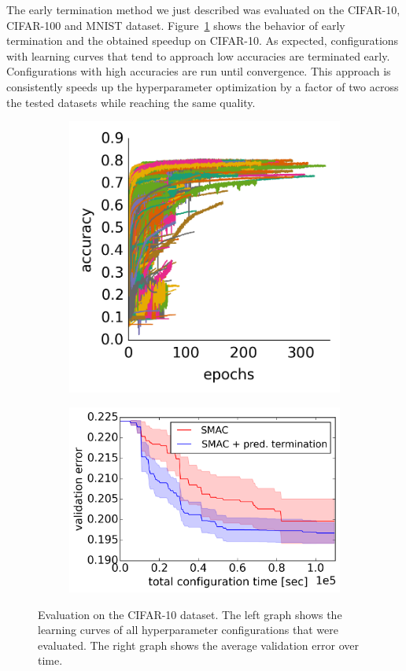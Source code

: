 The early termination method we just described was evaluated on the CIFAR-10, CIFAR-100 and MNIST dataset.
Figure~\ref{fig:earlyterm:eval} shows the behavior of early termination and the obtained speedup on CIFAR-10.
As expected, configurations with learning curves that tend to approach low accuracies are terminated early.
Configurations with high accuracies are run until convergence.
This approach is consistently speeds up the hyperparameter optimization by a factor of two across the tested datasets while reaching the same quality.
\begin{figure}
	\begin{subfigure}{0.4\textwidth}
		\centering
		\includegraphics[width=0.9\linewidth]{gfx/earlyterm/samples.png}
	\end{subfigure}
	\begin{subfigure}{0.6\textwidth}
		\centering
		\includegraphics[width=0.85\linewidth]{gfx/earlyterm/time.png}
	\end{subfigure}
	\caption{
		Evaluation on the CIFAR-10 dataset.
		The left graph shows the learning curves of all hyperparameter configurations that were evaluated.
		The right graph shows the average validation error over time.
	}\label{fig:earlyterm:eval}
\end{figure}
